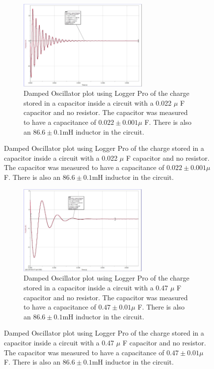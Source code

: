 \documentclass[12pt]{article}
\begin{document}
\begin{figure} [h]
    \begin{subfigure}
        \centering
        \includegraphics[width=0.7\textwidth]{figures/images/LCR_D1_Logger-Plot.jpg}
        \caption{Damped Oscillator plot using Logger Pro of the charge stored in a capacitor inside a circuit with a 0.022 $\mu$ F capacitor and no resistor. The capacitor was measured to have a capacitance of $0.022\pm0.001\mu$ F. There is also an $86.6\pm0.1$mH inductor in the circuit.}
        \label{fig:D1_022C_0R}
    \end{subfigure}
\end{figure}

\begin{figure} [h]
    \begin{subfigure}
        \centering
        \includegraphics[width=0.7\textwidth]{figures/images/LCR_D2_Logger-Plot.jpg}
        \caption{Damped Oscillator plot using Logger Pro of the charge stored in a capacitor inside a circuit with a 0.47 $\mu$ F capacitor and no resistor. The capacitor was measured to have a capacitance of $0.47\pm0.01\mu$ F. There is also an $86.6\pm0.1$mH inductor in the circuit.}
        \label{fig:D2_47C_0R}
    \end{subfigure}
\end{figure}
\end{document}
